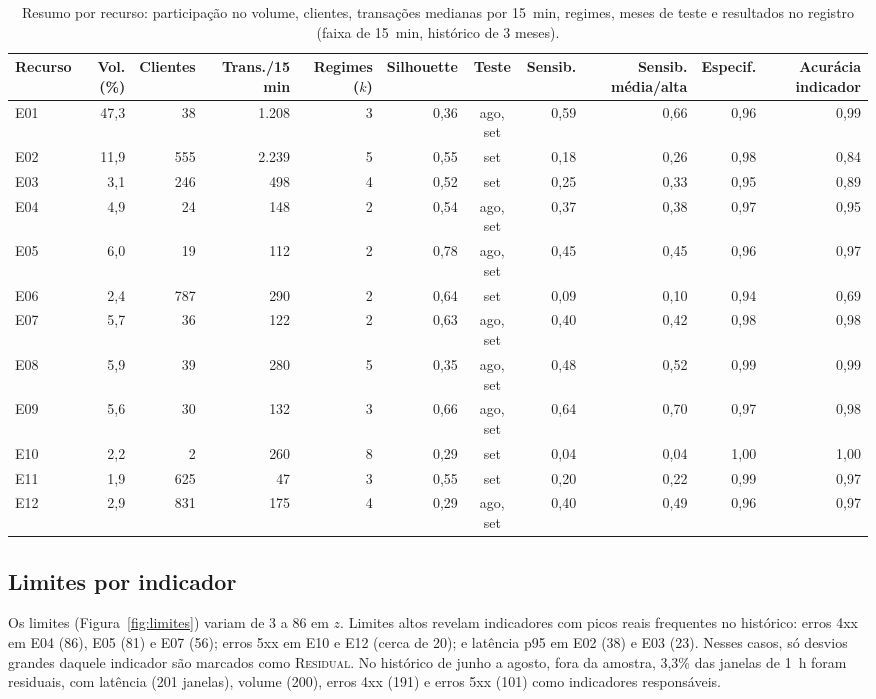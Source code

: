 \documentclass[sigconf,nonacm]{acmart}
\newcommand{\Residual}{\textsc{Residual}\xspace}
\begin{document}
\begin{table}[t]
  \caption{Resumo por recurso: participação no volume, clientes, transações medianas por 15~min, regimes, meses de teste e resultados no registro (faixa de 15~min, histórico de 3 meses).}
  \label{tab:recursos}
  \small
  \begin{tabular}{lrrrrrcrrrr}
    \toprule
    Recurso & Vol. (\%) & Clientes & Trans./15 min & Regimes ($k$) & Silhouette & Teste & Sensib. & Sensib. média/alta & Especif. & Acurácia indicador \\
    \midrule
    E01 & 47,3 & 38  & 1.208 & 3 & 0,36 & ago, set & 0,59 & 0,66 & 0,96 & 0,99 \\
    E02 & 11,9 & 555 & 2.239 & 5 & 0,55 & set & 0,18 & 0,26 & 0,98 & 0,84 \\
    E03 & 3,1  & 246 & 498   & 4 & 0,52 & set & 0,25 & 0,33 & 0,95 & 0,89 \\
    E04 & 4,9  & 24  & 148   & 2 & 0,54 & ago, set & 0,37 & 0,38 & 0,97 & 0,95 \\
    E05 & 6,0  & 19  & 112   & 2 & 0,78 & ago, set & 0,45 & 0,45 & 0,96 & 0,97 \\
    E06 & 2,4  & 787 & 290   & 2 & 0,64 & set & 0,09 & 0,10 & 0,94 & 0,69 \\
    E07 & 5,7  & 36  & 122   & 2 & 0,63 & ago, set & 0,40 & 0,42 & 0,98 & 0,98 \\
    E08 & 5,9  & 39  & 280   & 5 & 0,35 & ago, set & 0,48 & 0,52 & 0,99 & 0,99 \\
    E09 & 5,6  & 30  & 132   & 3 & 0,66 & ago, set & 0,64 & 0,70 & 0,97 & 0,98 \\
    E10 & 2,2  & 2   & 260   & 8 & 0,29 & set & 0,04 & 0,04 & 1,00 & 1,00 \\
    E11 & 1,9  & 625 & 47    & 3 & 0,55 & set & 0,20 & 0,22 & 0,99 & 0,97 \\
    E12 & 2,9  & 831 & 175   & 4 & 0,29 & ago, set & 0,40 & 0,49 & 0,96 & 0,97 \\
    \bottomrule
  \end{tabular}
\end{table}

\subsection{Limites por indicador}
Os limites (Figura~\ref{fig:limites}) variam de 3 a 86 em $z$. Limites altos revelam indicadores com picos reais frequentes no histórico: erros 4xx em E04 (86), E05 (81) e E07 (56); erros 5xx em E10 e E12 (cerca de 20); e latência p95 em E02 (38) e E03 (23). Nesses casos, só desvios grandes daquele indicador são marcados como \Residual. No histórico de junho a agosto, fora da amostra, 3,3\% das janelas de 1~h foram residuais, com latência (201 janelas), volume (200), erros 4xx (191) e erros 5xx (101) como indicadores responsáveis.
\end{document}
